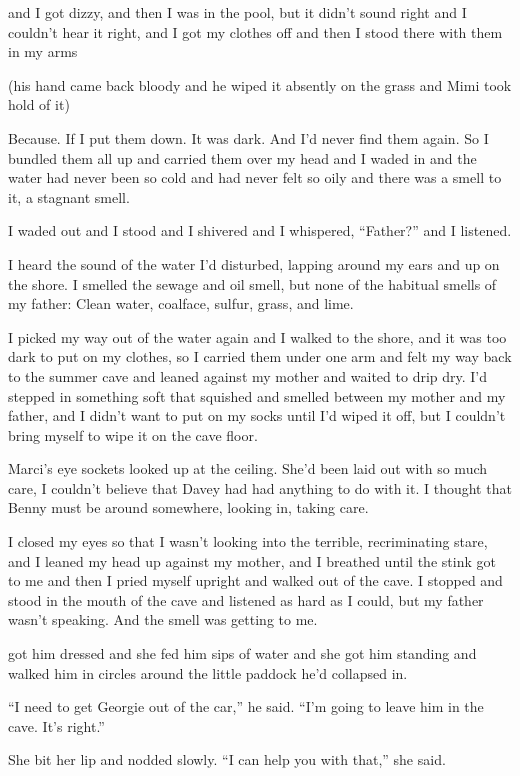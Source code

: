 and I got dizzy, and then I was in the pool, but it didn't sound right
and I couldn't hear it right, and I got my clothes off and then I
stood there with them in my arms\dash{}

(his hand came back bloody and he wiped it absently on the grass and
Mimi took hold of it)

Because.  If I put them down.  It was dark.  And I'd never find them
again.  So I bundled them all up and carried them over my head and I
waded in and the water had never been so cold and had never felt so
oily and there was a smell to it, a stagnant smell.

I waded out and I stood and I shivered and I whispered, ``Father?''
and I listened.

I heard the sound of the water I'd disturbed, lapping around my ears
and up on the shore.  I smelled the sewage and oil smell, but none of
the habitual smells of my father:  Clean water, coalface, sulfur,
grass, and lime.

I picked my way out of the water again and I walked to the shore, and
it was too dark to put on my clothes, so I carried them under one arm
and felt my way back to the summer cave and leaned against my mother
and waited to drip dry.  I'd stepped in something soft that squished
and smelled between my mother and my father, and I didn't want to put
on my socks until I'd wiped it off, but I couldn't bring myself to
wipe it on the cave floor.

Marci's eye sockets looked up at the ceiling.  She'd been laid out
with so much care, I couldn't believe that Davey had had anything to
do with it.  I thought that Benny must be around somewhere, looking
in, taking care.

I closed my eyes so that I wasn't looking into the terrible,
recriminating stare, and I leaned my head up against my mother, and I
breathed until the stink got to me and then I pried myself upright and
walked out of the cave.  I stopped and stood in the mouth of the cave
and listened as hard as I could, but my father wasn't speaking.  And
the smell was getting to me.

 got him dressed and she fed him sips of water and she got him
standing and walked him in circles around the little paddock he'd
collapsed in.

``I need to get Georgie out of the car,'' he said.  ``I'm going to
leave him in the cave.  It's right.''

She bit her lip and nodded slowly.  ``I can help you with that,'' she
said.

